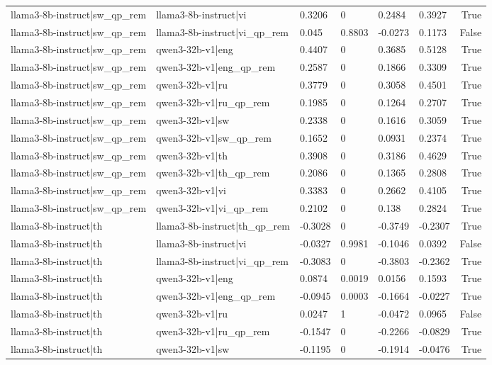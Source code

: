 \begin{table}
\begin{tabular}{llllllr}
llama3-8b-instruct|sw_qp_rem & llama3-8b-instruct|vi & 0.3206 & 0 & 0.2484 & 0.3927 & True \\
llama3-8b-instruct|sw_qp_rem & llama3-8b-instruct|vi_qp_rem & 0.045 & 0.8803 & -0.0273 & 0.1173 & False \\
llama3-8b-instruct|sw_qp_rem & qwen3-32b-v1|eng & 0.4407 & 0 & 0.3685 & 0.5128 & True \\
llama3-8b-instruct|sw_qp_rem & qwen3-32b-v1|eng_qp_rem & 0.2587 & 0 & 0.1866 & 0.3309 & True \\
llama3-8b-instruct|sw_qp_rem & qwen3-32b-v1|ru & 0.3779 & 0 & 0.3058 & 0.4501 & True \\
llama3-8b-instruct|sw_qp_rem & qwen3-32b-v1|ru_qp_rem & 0.1985 & 0 & 0.1264 & 0.2707 & True \\
llama3-8b-instruct|sw_qp_rem & qwen3-32b-v1|sw & 0.2338 & 0 & 0.1616 & 0.3059 & True \\
llama3-8b-instruct|sw_qp_rem & qwen3-32b-v1|sw_qp_rem & 0.1652 & 0 & 0.0931 & 0.2374 & True \\
llama3-8b-instruct|sw_qp_rem & qwen3-32b-v1|th & 0.3908 & 0 & 0.3186 & 0.4629 & True \\
llama3-8b-instruct|sw_qp_rem & qwen3-32b-v1|th_qp_rem & 0.2086 & 0 & 0.1365 & 0.2808 & True \\
llama3-8b-instruct|sw_qp_rem & qwen3-32b-v1|vi & 0.3383 & 0 & 0.2662 & 0.4105 & True \\
llama3-8b-instruct|sw_qp_rem & qwen3-32b-v1|vi_qp_rem & 0.2102 & 0 & 0.138 & 0.2824 & True \\
llama3-8b-instruct|th & llama3-8b-instruct|th_qp_rem & -0.3028 & 0 & -0.3749 & -0.2307 & True \\
llama3-8b-instruct|th & llama3-8b-instruct|vi & -0.0327 & 0.9981 & -0.1046 & 0.0392 & False \\
llama3-8b-instruct|th & llama3-8b-instruct|vi_qp_rem & -0.3083 & 0 & -0.3803 & -0.2362 & True \\
llama3-8b-instruct|th & qwen3-32b-v1|eng & 0.0874 & 0.0019 & 0.0156 & 0.1593 & True \\
llama3-8b-instruct|th & qwen3-32b-v1|eng_qp_rem & -0.0945 & 0.0003 & -0.1664 & -0.0227 & True \\
llama3-8b-instruct|th & qwen3-32b-v1|ru & 0.0247 & 1 & -0.0472 & 0.0965 & False \\
llama3-8b-instruct|th & qwen3-32b-v1|ru_qp_rem & -0.1547 & 0 & -0.2266 & -0.0829 & True \\
llama3-8b-instruct|th & qwen3-32b-v1|sw & -0.1195 & 0 & -0.1914 & -0.0476 & True \\

\end{tabular}
\end{table}

